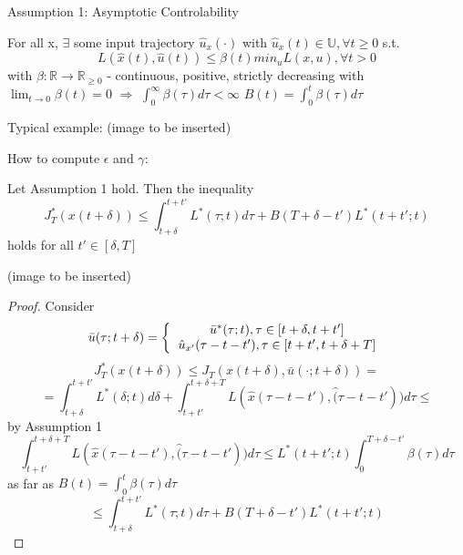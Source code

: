 Assumption 1: Asymptotic Controlability

For all x, $\exists$ some input trajectory $\hat u_x(\cdot)$
with $\hat u_x(t) \in \mathbb{U}, \forall t \geq 0$ s.t.
\begin{equation*}
L(\hat x(t),\hat u(t)) \leq \beta(t) min_u L(x,u), \forall t > 0
\end{equation*}
with $\beta: \mathbb{R} \to \mathbb{R}_{\geq 0}$
 - continuous, positive, strictly decreasing with $\lim_{t \to 0} \beta(t) = 0$ $\Rightarrow$
$\int_0^{\infty}\beta(\tau)d\tau < \infty$
$B(t) = \int_0^t\beta(\tau)d\tau$

Typical example: (image to be inserted)

How to compute $\epsilon$ and $\gamma$:
\begin{Lemma} 
Let Assumption 1 hold. Then the inequality 
\begin{equation}\label{lemma_1_inequality}
J_T^*(x(t+\delta)) \leq \int_{t+\delta}^{t+t'}L^*(\tau;t)d\tau + B(T+\delta - t')L^*(t+t';t)
\end{equation}
holds for all $t' \in [\delta,T]$

(image to be inserted)


\begin{proof}

Consider 
\begin{equation*}
\bar u(\tau;t+\delta) = \left \{
  \begin{tabular}{c}
  $\bar u^*(\tau;t), \tau \in [t+\delta, t+t']$ \\
  $\hat u_{x'}(\tau - t - t'), \tau \in [t+t', t+\delta + T]$
  \end{tabular}
\right.
\end{equation*}
\begin{equation*}
J^*_T(x(t+\delta)) \leq J_T(x(t+\delta), \bar u(\cdot;t+\delta)) =
\end{equation*}
\begin{equation*}
=\int^{t+t'}_{t+\delta}L^*(\delta;t)d\delta + \int_{t+t'}^{t+\delta+T}L(\hat x(\tau - t - t'), \hat (\tau - t - t'))d\tau \leq
\end{equation*} 
by Assumption 1
\begin{equation*}
\int_{t+t'}^{t+\delta+T}L(\hat x(\tau - t - t'), \hat (\tau - t - t'))d\tau \leq L^*(t+t';t) \int_0^{T+\delta-t'}\beta(\tau)d\tau
\end{equation*}
as far as $B(t) = \int_0^t\beta(\tau)d\tau$
\begin{equation*}
\leq \int_{t+\delta}^{t+t'}L^*(\tau;t)d\tau + B(T+\delta-t')L^*(t+t';t)
\end{equation*}
\end{proof}
\end{Lemma}

